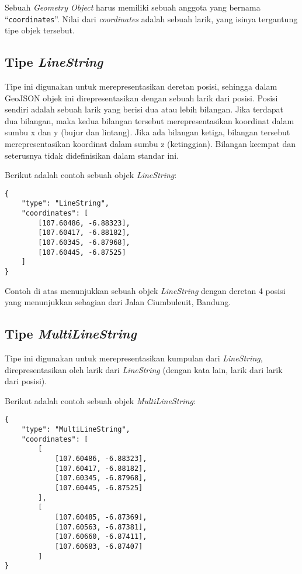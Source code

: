Sebuah \textit{Geometry Object} harus memiliki sebuah anggota yang bernama ``\texttt{coordinates}''. Nilai dari \textit{coordinates} adalah sebuah larik, yang isinya tergantung tipe objek tersebut.

\subsection{Tipe \textit{LineString}}

Tipe ini digunakan untuk merepresentasikan deretan posisi, sehingga dalam GeoJSON objek ini direpresentasikan dengan sebuah larik dari posisi. Posisi sendiri adalah sebuah larik yang berisi dua atau lebih bilangan. Jika terdapat dua bilangan, maka kedua bilangan tersebut merepresentasikan koordinat dalam sumbu x dan y (bujur dan lintang). Jika ada bilangan ketiga, bilangan tersebut merepresentasikan koordinat dalam sumbu z (ketinggian). Bilangan keempat dan seterusnya tidak didefinisikan dalam standar ini.

Berikut adalah contoh sebuah objek \textit{LineString}:

\begin{lstlisting}
{
	"type": "LineString",
	"coordinates": [
		[107.60486, -6.88323],
		[107.60417, -6.88182],
		[107.60345, -6.87968],
		[107.60445, -6.87525]
	]
}
\end{lstlisting}

Contoh di atas menunjukkan sebuah objek \textit{LineString} dengan deretan 4 posisi yang menunjukkan sebagian dari Jalan Ciumbuleuit, Bandung.

\subsection{Tipe \textit{MultiLineString}}

Tipe ini digunakan untuk merepresentasikan kumpulan dari \textit{LineString}, direpresentasikan oleh larik dari \textit{LineString} (dengan kata lain, larik dari larik dari posisi).

Berikut adalah contoh sebuah objek \textit{MultiLineString}:

\begin{lstlisting}
{
	"type": "MultiLineString",
	"coordinates": [
		[
			[107.60486, -6.88323],
			[107.60417, -6.88182],
			[107.60345, -6.87968],
			[107.60445, -6.87525]
		],
		[
			[107.60485, -6.87369],
			[107.60563, -6.87381],
			[107.60660, -6.87411],
			[107.60683, -6.87407]
		]
}
\end{lstlisting}

